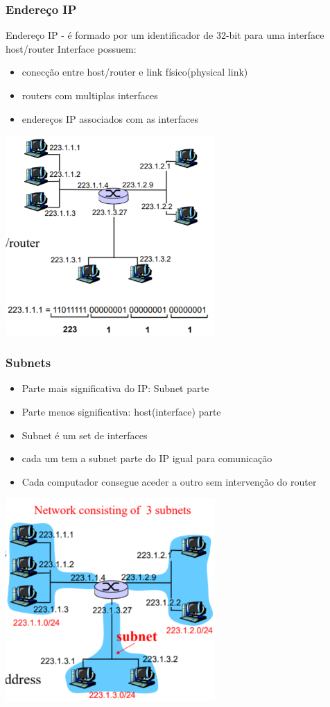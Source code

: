 \documentclass[../resumosRCOM.tex]{subfiles}
\begin{document}
\subsubsection{Endereço IP}
Endereço IP -  é formado por um identificador de  32-bit para uma interface host/router
Interface possuem:
\begin{itemize}
    \item conecção entre host/router e link físico(physical link)
    \item routers com multiplas interfaces
    \item endereços IP associados com as interfaces
\end{itemize}
\begin{center}
    \includegraphics[width=8cm]{images/RCOM16.png}
\end{center}

\subsubsection{Subnets}
\begin{itemize}
    \item Parte mais significativa do IP: Subnet parte
    \item Parte menos significativa: host(interface) parte
	\item Subnet é um set de interfaces
	\item cada um tem a subnet parte do IP igual para comunicação
	\item Cada computador consegue aceder a outro sem intervenção do router
\end{itemize}
\begin{center}
    \includegraphics[width=8cm]{images/RCOM17.png}
\end{center}
\end{document}
